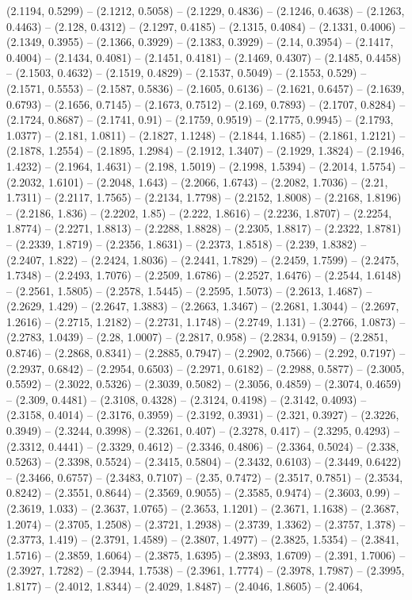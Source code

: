 (2.1194, 0.5299) -- (2.1212, 0.5058) -- (2.1229, 0.4836) -- (2.1246, 0.4638) -- (2.1263, 0.4463) -- (2.128, 0.4312) -- (2.1297, 0.4185) -- (2.1315, 0.4084) -- (2.1331, 0.4006) -- (2.1349, 0.3955) -- (2.1366, 0.3929) -- (2.1383, 0.3929) -- (2.14, 0.3954) -- (2.1417, 0.4004) -- (2.1434, 0.4081) -- (2.1451, 0.4181) -- (2.1469, 0.4307) -- (2.1485, 0.4458) -- (2.1503, 0.4632) -- (2.1519, 0.4829) -- (2.1537, 0.5049) -- (2.1553, 0.529) -- (2.1571, 0.5553) -- (2.1587, 0.5836) -- (2.1605, 0.6136) -- (2.1621, 0.6457) -- (2.1639, 0.6793) -- (2.1656, 0.7145) -- (2.1673, 0.7512) -- (2.169, 0.7893) -- (2.1707, 0.8284) -- (2.1724, 0.8687) -- (2.1741, 0.91) -- (2.1759, 0.9519) -- (2.1775, 0.9945) -- (2.1793, 1.0377) -- (2.181, 1.0811) -- (2.1827, 1.1248) -- (2.1844, 1.1685) -- (2.1861, 1.2121) -- (2.1878, 1.2554) -- (2.1895, 1.2984) -- (2.1912, 1.3407) -- (2.1929, 1.3824) -- (2.1946, 1.4232) -- (2.1964, 1.4631) -- (2.198, 1.5019) -- (2.1998, 1.5394) -- (2.2014, 1.5754) -- (2.2032, 1.6101) -- (2.2048, 1.643) -- (2.2066, 1.6743) -- (2.2082, 1.7036) -- (2.21, 1.7311) -- (2.2117, 1.7565) -- (2.2134, 1.7798) -- (2.2152, 1.8008) -- (2.2168, 1.8196) -- (2.2186, 1.836) -- (2.2202, 1.85) -- (2.222, 1.8616) -- (2.2236, 1.8707) -- (2.2254, 1.8774) -- (2.2271, 1.8813) -- (2.2288, 1.8828) -- (2.2305, 1.8817) -- (2.2322, 1.8781) -- (2.2339, 1.8719) -- (2.2356, 1.8631) -- (2.2373, 1.8518) -- (2.239, 1.8382) -- (2.2407, 1.822) -- (2.2424, 1.8036) -- (2.2441, 1.7829) -- (2.2459, 1.7599) -- (2.2475, 1.7348) -- (2.2493, 1.7076) -- (2.2509, 1.6786) -- (2.2527, 1.6476) -- (2.2544, 1.6148) -- (2.2561, 1.5805) -- (2.2578, 1.5445) -- (2.2595, 1.5073) -- (2.2613, 1.4687) -- (2.2629, 1.429) -- (2.2647, 1.3883) -- (2.2663, 1.3467) -- (2.2681, 1.3044) -- (2.2697, 1.2616) -- (2.2715, 1.2182) -- (2.2731, 1.1748) -- (2.2749, 1.131) -- (2.2766, 1.0873) -- (2.2783, 1.0439) -- (2.28, 1.0007) -- (2.2817, 0.958) -- (2.2834, 0.9159) -- (2.2851, 0.8746) -- (2.2868, 0.8341) -- (2.2885, 0.7947) -- (2.2902, 0.7566) -- (2.292, 0.7197) -- (2.2937, 0.6842) -- (2.2954, 0.6503) -- (2.2971, 0.6182) -- (2.2988, 0.5877) -- (2.3005, 0.5592) -- (2.3022, 0.5326) -- (2.3039, 0.5082) -- (2.3056, 0.4859) -- (2.3074, 0.4659) -- (2.309, 0.4481) -- (2.3108, 0.4328) -- (2.3124, 0.4198) -- (2.3142, 0.4093) -- (2.3158, 0.4014) -- (2.3176, 0.3959) -- (2.3192, 0.3931) -- (2.321, 0.3927) -- (2.3226, 0.3949) -- (2.3244, 0.3998) -- (2.3261, 0.407) -- (2.3278, 0.417) -- (2.3295, 0.4293) -- (2.3312, 0.4441) -- (2.3329, 0.4612) -- (2.3346, 0.4806) -- (2.3364, 0.5024) -- (2.338, 0.5263) -- (2.3398, 0.5524) -- (2.3415, 0.5804) -- (2.3432, 0.6103) -- (2.3449, 0.6422) -- (2.3466, 0.6757) -- (2.3483, 0.7107) -- (2.35, 0.7472) -- (2.3517, 0.7851) -- (2.3534, 0.8242) -- (2.3551, 0.8644) -- (2.3569, 0.9055) -- (2.3585, 0.9474) -- (2.3603, 0.99) -- (2.3619, 1.033) -- (2.3637, 1.0765) -- (2.3653, 1.1201) -- (2.3671, 1.1638) -- (2.3687, 1.2074) -- (2.3705, 1.2508) -- (2.3721, 1.2938) -- (2.3739, 1.3362) -- (2.3757, 1.378) -- (2.3773, 1.419) -- (2.3791, 1.4589) -- (2.3807, 1.4977) -- (2.3825, 1.5354) -- (2.3841, 1.5716) -- (2.3859, 1.6064) -- (2.3875, 1.6395) -- (2.3893, 1.6709) -- (2.391, 1.7006) -- (2.3927, 1.7282) -- (2.3944, 1.7538) -- (2.3961, 1.7774) -- (2.3978, 1.7987) -- (2.3995, 1.8177) -- (2.4012, 1.8344) -- (2.4029, 1.8487) -- (2.4046, 1.8605) -- (2.4064, 